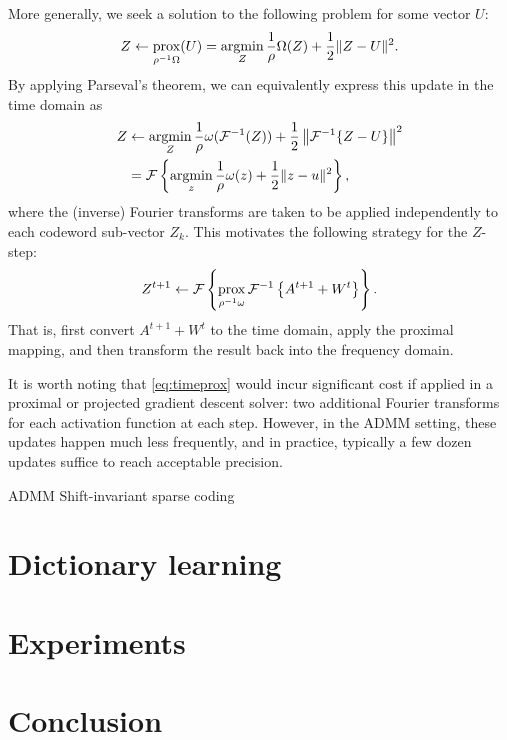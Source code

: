 \documentclass{article} %
\begin{document}
More generally, we seek a solution to the following problem for some vector $U$:
\[
Z \leftarrow \operatorname*{prox}_{\rho^{-1}\Omega}(U) = \operatorname*{argmin}_Z \frac{1}{\rho}\Omega(Z) + \frac{1}{2} \| Z - U\|^2.
\]
By applying Parseval's theorem, we can equivalently express this update in the time
domain as
\begin{align*}
Z &\leftarrow \operatorname*{argmin}_Z \frac{1}{\rho} \omega(\mathcal{F}^{-1}(Z)) +
\frac{1}{2}\left\|\mathcal{F}^{-1}\{Z - U\}\right\|^2\notag\\
&= \mathcal{F}\left\{\operatorname*{argmin}_z \frac{1}{\rho} \omega(z) + \frac{1}{2} \|z - u\|^2
\right\},\label{eq:time-regularize}
\end{align*}
where the (inverse) Fourier transforms are taken to be applied independently to 
each codeword sub-vector $Z_k$.  
This motivates the following strategy for the $Z$-step:
\begin{equation}
Z^{t+1} \leftarrow \mathcal{F}\left\{ \operatorname*{prox}_{\rho^{-1}\omega} \mathcal{F}^{-1}\left\{A^{t+1} + W^t
\right\} \right\}.\label{eq:timeprox}
\end{equation}
That is, first convert $A^{t+1} + W^t$ to the time domain, apply the
proximal mapping, and then transform the result back into the frequency domain.

It is worth noting that \eqref{eq:timeprox} would incur significant cost if applied 
in a proximal or projected gradient descent solver: two additional Fourier transforms 
for each activation function at each step.  However, in the ADMM setting, these updates 
happen much less frequently, and in practice, typically a few dozen updates suffice to 
reach acceptable precision.

\begin{algorithm}[t]
\caption{ADMM Shift-invariant sparse coding\label{alg:sisc}}
\begin{algorithmic}[1]
\REPEAT{}
     
     
 
\end{algorithmic}
\end{algorithm}

\section{Dictionary learning}

\section{Experiments}

\section{Conclusion}



\end{document}
